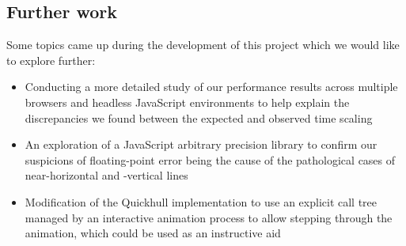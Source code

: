 \documentclass[11pt]{article}
\begin{document}
\subsection{Further work}
Some topics came up during the development of this project which we would like to explore further:

\begin{itemize}
\item
Conducting a more detailed study of our performance results across multiple browsers and headless JavaScript environments to help explain the discrepancies we found between the expected and observed time scaling
\item
An exploration of a JavaScript arbitrary precision library to confirm our suspicions of floating-point error being the cause of the pathological cases of near-horizontal and -vertical lines
\item
Modification of the Quickhull implementation to use an explicit call tree managed by an interactive animation process to allow stepping through the animation, which could be used as an instructive aid
\end{itemize}

\nocite{Princeton:QH}
\nocite{CLRS}



\end{document}
